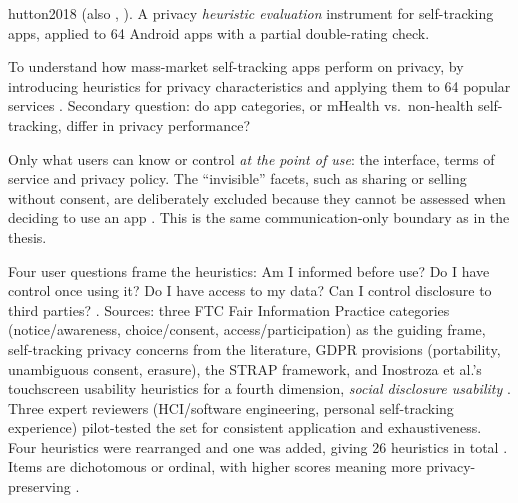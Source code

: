 \begin{papercard}{hutton2018}
    (also , ). A privacy \emph{heuristic evaluation} instrument for self-tracking apps, applied to 64 Android apps with a partial double-rating check.

 To understand how mass-market self-tracking apps perform on privacy, by introducing heuristics for privacy characteristics and applying them to 64 popular services . Secondary question: do app categories, or mHealth vs.\ non-health self-tracking, differ in privacy performance?

 Only what users can know or control \emph{at the point of use}: the interface, terms of service and privacy policy. The ``invisible'' facets, such as sharing or selling without consent, are deliberately excluded because they cannot be assessed when deciding to use an app . This is the same communication-only boundary as in the thesis.

 Four user questions frame the heuristics: Am I informed before use? Do I have control once using it? Do I have access to my data? Can I control disclosure to third parties? . Sources: three FTC Fair Information Practice categories (notice/awareness, choice/consent, access/participation) as the guiding frame, self-tracking privacy concerns from the literature, GDPR provisions (portability, unambiguous consent, erasure), the STRAP framework, and Inostroza et al.'s touchscreen usability heuristics for a fourth dimension, \emph{social disclosure usability} . Three expert reviewers (HCI/software engineering, personal self-tracking experience) pilot-tested the set for consistent application and exhaustiveness. Four heuristics were rearranged and one was added, giving 26 heuristics in total . Items are dichotomous or ordinal, with higher scores meaning more privacy-preserving .


\end{papercard}
